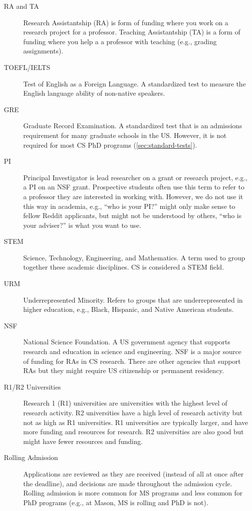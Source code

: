 \documentclass[oneside,11pt,dvipsnames]{book}
\begin{document}
\begin{description}
  \item[RA and TA] Research Assistantship (RA) is form of funding where you work on a research project for a professor. Teaching Assistantship (TA) is a form of funding where you help a a professor with teaching (e.g., grading assignments).

  \item[TOEFL/IELTS] Test of English as a Foreign Language. A standardized test to measure the English language ability of non-native speakers.
  \item[GRE] Graduate Record Examination. A standardized test that is an admissions requirement for many graduate schools in the US. However, it is not required for most CS PhD programs (\autoref{sec:standard-tests}).

  \item [PI]  Principal Investigator is lead researcher on a grant or research project, e.g., a PI on an NSF grant.  Prospective students often use this term to refer to a professor they are interested in working with.  However, we do not use it this way in academia, e.g., ``who is your PI?'' might only make sense to fellow Reddit applicants, but might not be understood by others, ``who is your adviser?'' is what you want to use.
    \item[STEM] Science, Technology, Engineering, and Mathematics. A term used to group together these academic disciplines. CS is considered a STEM field.
  \item[URM] Underrepresented Minority. Refers to groups that are underrepresented in higher education, e.g., Black, Hispanic, and Native American students.
  \item[NSF] National Science Foundation. A US government agency that supports research and education in science and engineering. NSF is a major source of funding for RAs in CS research. There are other agencies that support RAs but they might require US citizenship or permanent residency.
        \item [R1/R2 Universities] Research 1 (R1) universities are universities with the highest level of research activity. R2 universities have a high level of research activity but not as high as R1 universities.  R1 universities are typically larger, and have more funding and resources for research.  R2 universities are also good but might have fewer resources and funding.
  
        \item [Rolling Admission] Applications are reviewed as they are received (instead of all at once after the deadline), and decisions are made throughout the admission cycle.  Rolling admission is more common for MS programs and less common for PhD programs (e.g., at Mason, MS is rolling and PhD is not).


\end{description}
\end{document}

